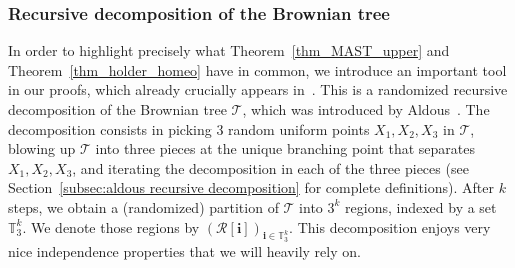 \documentclass[11pt]{article}
\newcommand{\Tt}{\mathcal{T}}
\newcommand{\Rr}{\mathcal{R}}
\newcommand{\ii}{\mathbf{i}}
\theoremstyle{plain}
\theoremstyle{definition}
\numberwithin{equation}{section}
\begin{document}
\subsubsection*{Recursive decomposition of the Brownian tree}
In order to highlight precisely what Theorem~\ref{thm_MAST_upper} and Theorem~\ref{thm_holder_homeo} have in common, we introduce an important tool in our proofs, which already crucially appears in~\cite{aldous_largest_2022}.
This is a randomized recursive decomposition of the Brownian tree $\Tt$, which was introduced by Aldous~\cite{aldous_recursive_1994}.
The decomposition consists in picking $3$ random uniform points $X_1, X_2, X_3$ in $\Tt$, blowing up $\Tt$ into three pieces at the unique branching point that separates $X_1, X_2, X_3$, and iterating the decomposition in each of the three pieces (see Section~\ref{subsec:aldous recursive decomposition} for complete definitions).
After $k$ steps, we obtain a (randomized) partition of $\Tt$ into $3^k$ regions, indexed by a set $\mathbb{T}_3^k$.
We denote those regions by $\left( \Rr[\ii] \right)_{\ii \in \mathbb{T}_3^k}$.
This decomposition enjoys very nice independence properties that we will heavily rely on.
\end{document}
